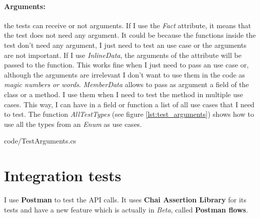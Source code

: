 \paragraph{Arguments:} the tests can receive or not arguments. If I use the \textit{Fact} attribute, it means that the test does not need any argument. 
    It could be because the functions inside the test don't need any argument, I just need to test an use case or the arguments are not important. 
    If I use \textit{InlineData}, the arguments of the attribute will be passed to the function. This works fine when I just need to pass an use case or, although the arguments are irrelevant I don't want to use 
    them in the code as \textit{magic numbers or words}. 
    \textit{MemberData} allows to pass as argument a field of the class or a method. I use them when I need to test the method in multiple use cases. This way, I can have in a field or function a list of all use cases that I need to test. 
    The function \textit{AllTestTypes} (see figure \ref{lst:test_arguments}) shows how to use all the types from an \textit{Enum} as use cases.
    
    {code/TestArguments.cs}

\section{Integration tests}
I use \textbf{Postman} to test the API calls. It uses \textbf{Chai Assertion Library} \cite{Chai} for its tests and have a new feature which is actually in \textit{Beta}, called \textbf{Postman flows}. 

